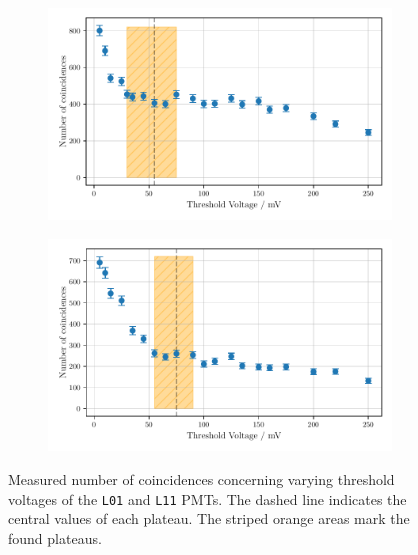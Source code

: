 \begin{figure}
    \centering
    \begin{subfigure}[b]{0.48\textwidth}
        \includegraphics[width=\textwidth]{plots/threshL01.pdf}
    \end{subfigure}\hfill
    \begin{subfigure}[b]{0.48\textwidth}
        \includegraphics[width=\textwidth]{plots/threshL11.pdf}
    \end{subfigure}
    \caption{Measured number of coincidences concerning varying threshold voltages
    of the \texttt{L01} and \texttt{L11} PMTs.
    The dashed line indicates the central values of each plateau. The striped orange areas mark the found plateaus.}
    \label{fig:appthresh4}
\end{figure}
